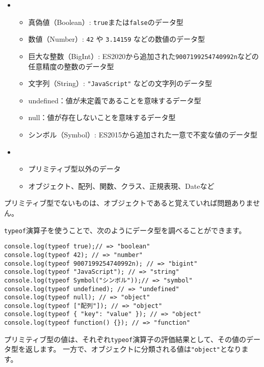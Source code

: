 \begin{itemize}
\item

  \begin{itemize}
  \item
    真偽値（Boolean）:
    \texttt{true}または\texttt{false}のデータ型
  \item
    数値（Number）: \texttt{42} や
    \texttt{3.14159} などの数値のデータ型
  \item
    巨大な整数（BigInt）: ES2020から追加された\texttt{9007199254740992n}などの任意精度の整数のデータ型
  \item
    文字列（String）: \texttt{"JavaScript"}
    などの文字列のデータ型
  \item
    undefined：値が未定義であることを意味するデータ型
  \item
    null：値が存在しないことを意味するデータ型
  \item
    シンボル（Symbol）: ES2015から追加された一意で不変な値のデータ型
  \end{itemize}
\item

  \begin{itemize}
  \item
    プリミティブ型以外のデータ
  \item
    オブジェクト、配列、関数、クラス、正規表現、Dateなど
  \end{itemize}
\end{itemize}

プリミティブ型でないものは、オブジェクトであると覚えていれば問題ありません。

\texttt{typeof}演算子を使うことで、次のようにデータ型を調べることができます。

\begin{lstlisting}
console.log(typeof true);// => "boolean"
console.log(typeof 42); // => "number"
console.log(typeof 9007199254740992n); // => "bigint"
console.log(typeof "JavaScript"); // => "string"
console.log(typeof Symbol("シンボル"));// => "symbol"
console.log(typeof undefined); // => "undefined"
console.log(typeof null); // => "object"
console.log(typeof ["配列"]); // => "object"
console.log(typeof { "key": "value" }); // => "object"
console.log(typeof function() {}); // => "function"
\end{lstlisting}

プリミティブ型の値は、それぞれ\texttt{typeof}演算子の評価結果として、その値のデータ型を返します。
一方で、オブジェクトに分類される値は\texttt{"object"}となります。

